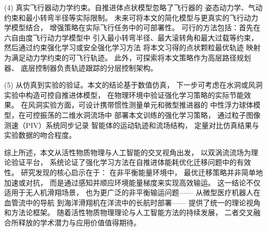 (4) 真实飞行器动力学约束。自推进体点状模型忽略了飞行器的
姿态动力学、气动约束和最小转弯半径等实际限制。
未来可将本文的简化模型与更真实的飞行动力学模型结合，
增强策略在实际飞行任务中的可部署性。
可行的方法包括：首先在六自由度飞行动力学模型中
引入最小转弯半径、最大滚转角和最大过载等约束，
然后通过约束强化学习或安全强化学习方法
将本文习得的点状颗粒最优轨迹
映射为满足动力学约束的可飞行轨迹。
此外，可探索将本文策略作为高层路径规划器、
底层控制器负责轨迹跟踪的分层控制架构。

(5) 从仿真到实验的验证。本文的结论基于数值仿真，
下一步可考虑在水洞或风洞实验中构造可控自推进体模型，
在物理环境中验证强化学习策略的实际节能效果。
在风洞实验方面，可设计携带惯性测量单元和微型推进器的
中性浮力球体模型，在可控振荡的二维水洞流场中
部署本文训练的强化学习策略，
通过粒子图像测速（PIV）系统同步记录
智能体的运动轨迹和流场结构，
定量对比仿真结果与实验数据的吻合程度。


综上所述，本文从活性物质物理与人工智能的交叉视角出发，
以双涡流流场为理论验证平台，
系统论证了强化学习方法在自推进体能耗优化迁移问题中的有效性。
研究发现的核心启示在于：
在非平衡能量环境中，
最优迁移策略并非简单地加速或对抗，
而是通过感知并顺应环境能量梯度来实现高效输运。
这一结论不仅适用于无人机滑翔场景，
也为更广泛的非平衡输运问题——
从微型医疗机器人在血管流中的导航
到海洋滑翔机在洋流中的长航时部署——
提供了统一的理论视角和方法论框架。
随着活性物质物理理论与人工智能方法的持续发展，
二者交叉融合所释放的学术潜力与应用价值值得期待。